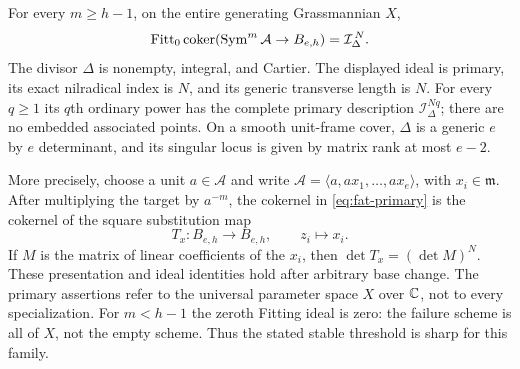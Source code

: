 \begin{theorem}
\label{thm:fat-primary}
For every $m\ge h-1$, on the entire generating Grassmannian $X$,
\begin{equation}\label{eq:fat-primary}
 \operatorname{Fitt}_0\operatorname{coker}(\operatorname{Sym}^m\mathcal A\to B_{e,h})
       =\mathcal I_\Delta^{\,N}.
\end{equation}
The divisor $\Delta$ is nonempty, integral, and Cartier. The displayed
ideal is primary, its exact nilradical index is $N$, and its generic
transverse length is $N$. For every $q\ge1$ its $q$th ordinary power
has the complete primary description $\mathcal I_\Delta^{Nq}$;
there are no embedded associated points. On a smooth unit-frame cover,
$\Delta$ is a generic $e$ by $e$ determinant, and its singular locus
is given by matrix rank at most $e-2$.

More precisely, choose a unit $a\in\mathcal A$ and write
$\mathcal A=\langle a,ax_1,\ldots,ax_e\rangle$, with $x_i\in\mathfrak m$.
After multiplying the target by $a^{-m}$, the cokernel in
\eqref{eq:fat-primary} is the cokernel of the square substitution map
\[
 T_x:B_{e,h}\longrightarrow B_{e,h},\qquad z_i\longmapsto x_i.
\]
If $M$ is the matrix of linear coefficients of the $x_i$, then
$\det T_x=(\det M)^N$. These presentation and ideal identities hold
after arbitrary base change. The primary assertions refer to the
universal parameter space $X$ over $\mathbb C$, not to every specialization.
For $m<h-1$ the zeroth Fitting ideal is zero: the failure scheme
is all of $X$, not the empty scheme. Thus the stated stable
threshold is sharp for this family.
\end{theorem}
